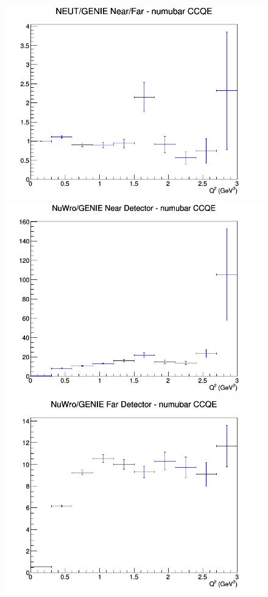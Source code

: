 \documentclass[12pt]{article}
\begin{document}
\begin{figure}[h]
\endminipage
{}
\includegraphics[width=\linewidth]{eff_Q2/FGT/ratios/CCQE_NEUT_GENIE_numubar_NF_Q2.png}
\endminipage
\newline
{}
\includegraphics[width=\linewidth]{eff_Q2/FGT/ratios/CCQE_NuWro_GENIE_numubar_near_Q2.png}
\endminipage
{}
\includegraphics[width=\linewidth]{eff_Q2/FGT/ratios/CCQE_NuWro_GENIE_numubar_far_Q2.png}

\end{figure}
\end{document}
